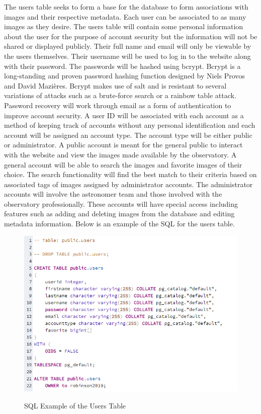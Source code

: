 \documentclass[12pt]{report}
\begin{document}
The users table seeks to form a base for the database to form associations with images and their respective metadata.  Each user can be associated to as many images as they desire.  The users table will contain some personal information about the user for the purpose of account security but the information will not be shared or displayed publicly.  Their full name and email will only be viewable by the users themselves.  Their username will be used to log in to the website along with their password.  The passwords will be hashed using bcrypt.  Bcrypt is a long-standing and proven password hashing function designed by Niels Provos and David Mazières.  Bcrypt makes use of salt and is resistant to several variations of attacks such as a brute-force search or a rainbow table attack.  Password recovery will work through email as a form of authentication to improve account security.  
A user ID will be associated with each account as a method of keeping track of accounts without any personal identification and each account will be assigned an account type.  The account type will be either public or administrator.  A public account is meant for the general public to interact with the website and view the images made available by the observatory.  A general account will be able to search the images and favorite images of their choice.  The search functionality will find the best match to their criteria based on associated tags of images assigned by administrator accounts.  The administrator accounts will involve the astronomer team and those involved with the observatory professionally.  These accounts will have special access including features such as adding and deleting images from the database and editing metadata information.
Below is an example of the SQL for the users table.


\begin{figure}[h]
	\centering
	\caption{SQL Example of the Users Table}
	\includegraphics[width=\linewidth]{database_user_table}
	\label{fig:SQL Users Table}
\end{figure}
\end{document}

